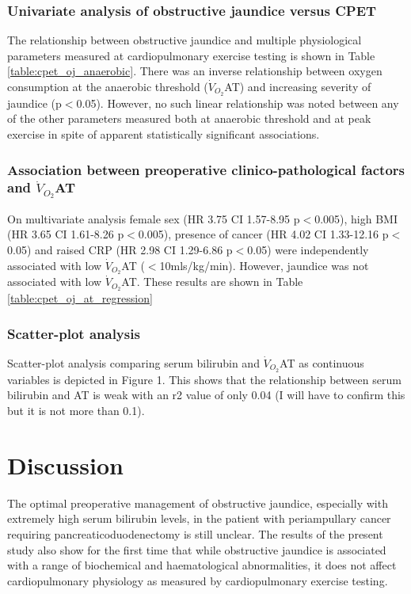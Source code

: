 

\subsubsection{Univariate analysis of obstructive jaundice versus CPET}
The relationship between obstructive jaundice and multiple physiological parameters measured at cardiopulmonary exercise testing is shown in Table \ref{table:cpet_oj_anaerobic}. There was an inverse relationship between oxygen consumption at the anaerobic threshold ($\dot{V}_{O_2}$AT) and increasing severity of jaundice (p$<$0.05). However, no such linear relationship was noted between any of the other parameters measured both at anaerobic threshold and at peak exercise in spite of apparent statistically significant associations.




\subsubsection{Association between preoperative clinico-pathological factors and $\dot{V}_{O_2}$AT}
On multivariate analysis female sex (HR 3.75 CI 1.57-8.95 p$<$0.005), high BMI (HR 3.65 CI 1.61-8.26 p$<$0.005), presence of cancer (HR 4.02 CI 1.33-12.16 p$<$0.05) and raised CRP (HR 2.98 CI 1.29-6.86 p$<$0.05) were independently associated with low $\dot{V}_{O_2}$AT ($<$10mls/kg/min). However, jaundice was not associated with low $\dot{V}_{O_2}$AT. These results are shown in Table \ref{table:cpet_oj_at_regression}




\subsubsection{Scatter-plot analysis}
Scatter-plot analysis comparing serum bilirubin and $\dot{V}_{O_2}$AT as continuous variables is depicted in Figure 1. This shows that the relationship between serum bilirubin and AT is weak with an r2 value of only 0.04 (I will have to confirm this but it is not more than 0.1). 

\clearpage

\section{Discussion}
The optimal preoperative management of obstructive jaundice, especially with extremely high serum bilirubin levels, in the patient with periampullary cancer requiring pancreaticoduodenectomy is still unclear. The results of the present study also show for the first time that while obstructive jaundice is associated with a range of biochemical and haematological abnormalities, it does not affect cardiopulmonary physiology as measured by cardiopulmonary exercise testing. 

